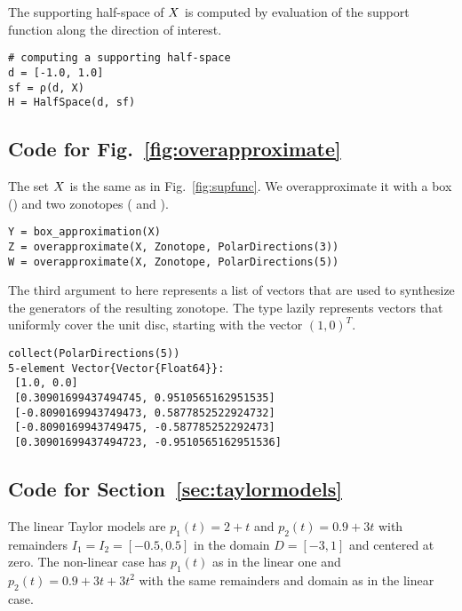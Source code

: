 The supporting half-space of $X$ is computed by evaluation of the support function along the direction of interest.

\begin{minipage}{\linewidth}
\begin{lstlisting}
# computing a supporting half-space
d = [-1.0, 1.0]
sf = ρ(d, X)
H = HalfSpace(d, sf)
\end{lstlisting}
\end{minipage}


\subsection{Code for Fig.~\ref{fig:overapproximate}}

The set $X$ is the same as in Fig.~\ref{fig:supfunc}.
We overapproximate it with a box () and two zonotopes ( and ).

\begin{minipage}{\linewidth}
\begin{lstlisting}
Y = box_approximation(X)
Z = overapproximate(X, Zonotope, PolarDirections(3))
W = overapproximate(X, Zonotope, PolarDirections(5))
\end{lstlisting}
\end{minipage}

The third argument to  here represents a list of vectors that are used to synthesize the generators of the resulting zonotope.
The type  lazily represents vectors that uniformly cover the unit disc, starting with the vector $(1, 0)^T$.

\begin{minipage}{\linewidth}
\begin{lstlisting}
collect(PolarDirections(5))
5-element Vector{Vector{Float64}}:
 [1.0, 0.0]
 [0.30901699437494745, 0.9510565162951535]
 [-0.8090169943749473, 0.5877852522924732]
 [-0.8090169943749475, -0.587785252292473]
 [0.30901699437494723, -0.9510565162951536]
\end{lstlisting}
\end{minipage}

\subsection{Code for Section~\ref{sec:taylormodels}} \label{sec:taylormodels_appendix}

The linear Taylor models are $p_1(t) = 2 + t$ and $p_2(t) = 0.9 + 3t$ with remainders $I_1 = I_2 = [-0.5, 0.5]$ in the domain $D = [-3, 1]$ and centered at zero.
%
The non-linear case has $p_1(t)$ as in the linear one and $p_2(t) = 0.9 + 3t + 3t^2$ with the same remainders and domain as in the linear case.

